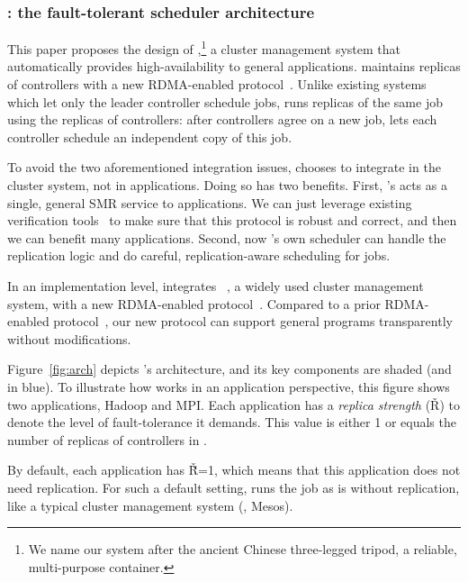 \vspace{-.15in}\subsubsection{\tripod: the fault-tolerant scheduler 
architecture} 
\label{sec:scheduler-arch}\vspace{-.075in}

This paper proposes the design of \tripod,\footnote{We name our system after 
the ancient Chinese three-legged tripod, a reliable, multi-purpose container.} 
a cluster management system that automatically provides high-availability to 
general applications. \tripod maintains replicas of controllers with a new 
RDMA-enabled \paxos protocol~\cite{falcon:github}. Unlike existing systems 
which let only the leader controller schedule jobs, \tripod runs replicas of 
the same job using the replicas of controllers: after controllers agree on a 
new job, \tripod lets each controller schedule an independent copy of this job.

To avoid the two aforementioned integration issues, \tripod chooses to 
integrate 
\paxos in the cluster system, not in applications. Doing so has two benefits. 
First, \tripod's \paxos acts as a single, general SMR service to applications. 
We 
can just leverage existing verification 
tools~\cite{modist:nsdi09,demeter:sosp11} to make sure that this \paxos 
protocol is robust and correct, and then we can benefit many applications. 
Second, now \tripod's own scheduler can handle the replication logic and do 
careful, replication-aware scheduling for jobs.

In an implementation level, \tripod integrates \mesos~\cite{mesos:nsdi11}, a 
widely 
used cluster management system, with a new RDMA-enabled \paxos 
protocol~\cite{falcon:github}. Compared to a prior RDMA-enabled \paxos 
protocol~\cite{dare:hpdc15}, our new protocol can support general programs 
transparently without modifications.

Figure~\ref{fig:arch} depicts \tripod's architecture, and its key components 
are 
shaded (and in blue). To illustrate how \tripod works in an application 
perspective, this figure shows two applications, Hadoop and MPI. Each 
application has a \emph{replica strength} (\v{R}) to denote the level of 
fault-tolerance it demands. This value is either 1 or equals the number of 
replicas of controllers in \tripod.

By default, each application has \v{\v{R}=1}, which means that this application 
does not need replication. For such a default setting, \tripod runs the job as 
is 
without replication, like a typical cluster management system (\eg, Mesos).


